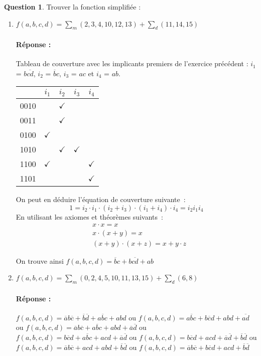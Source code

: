\documentclass[11pt,a4paper]{article}
\theoremstyle{definition}%
\newtheorem{Q}{Question}[] %
\newcommand{\reponse}[1]{%
	\ifthenelse {\boolean{corrige}} {\paragraph{Réponse :} \color{darkblue}   #1\color{black}} {}
 }
\begin{document}
\begin{Q}
Trouver la fonction simplifiée :
\begin{enumerate}
	\item $f(a,b,c,d)=\sum_m(2,3,4,10,12,13)+\sum_d(11,14,15)$
	\reponse{
		Tableau de couverture avec les implicants premiers de l'exercice précédent :
		$i_1$ = $b\overline{cd}$, $i_2$ = $\overline{b}c$, $i_3$ = $ac$ et $i_4$ = $ab$.

		\begin{center}
			\begin{tabular}{ccccc}
			 & $i_1$ & $i_2$ & $i_3$ & $i_4$ \\ \hline
			 0010 & & $\checkmark$ & & \\ \hline
			 0011 & & $\checkmark$ & & \\ \hline
			 0100 & $\checkmark$ & & & \\ \hline
			 1010 & & $\checkmark$ & $\checkmark$ & \\ \hline
			 1100 & $\checkmark$ &  &  & $\checkmark$ \\ \hline
			 1101 & & & & $\checkmark$ \\ \hline
			\end{tabular}
		\end{center}

		On peut en déduire l'équation de couverture suivante~:
		\[1 = i_2 \cdot i_1 \cdot (i_2 + i_3) \cdot (i_1 + i_4) \cdot i_4 = i_2i_1i_4\]
		En utilisant les axiomes et théorèmes suivants~:
		\begin{align*}
		& x \cdot x = x\\
		& x \cdot (x + y) = x\\
		& (x + y) \cdot (x + z) = x + y \cdot z
		\end{align*}

		On trouve ainsi $f(a,b,c,d)=\overline{b}c+b\overline{cd}+ab$
	}

	\item $f(a,b,c,d)=\sum_m(0,2,4,5,10,11,13,15)+\sum_d(6,8)$
	\reponse {
		$f(a,b,c,d)=\overline{a}b\overline{c}+\overline{b}\overline{d}+a\overline{b}c+abd$
	ou $f(a,b,c,d)=a\overline{b}c+b\overline{c}d+abd+\overline{ad}$
	ou $f(a,b,c,d)=\overline{a}b\overline{c} + a\overline{b}c + abd + \overline{a}\overline{d}$
	ou $f(a,b,c,d)=b\overline{c}d + a\overline{b}c + acd + \overline{a}\overline{d}$
	ou $f(a,b,c,d)=b\overline{c}d + acd + \overline{a}\overline{d} + \overline{b}\overline{d}$
	ou $f(a,b,c,d)=\overline{a}b\overline{c} + acd + abd + \overline{b}\overline{d}$
	ou $f(a,b,c,d)=\overline{a}b\overline{c} + b\overline{c}d + acd + \overline{b}\overline{d}$
	}


\end{enumerate}
\end{Q}
\end{document}
